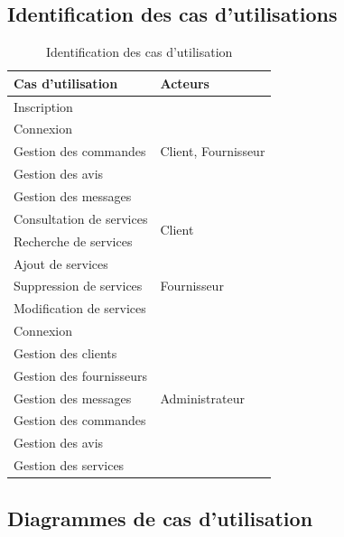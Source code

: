 \documentclass[french]{report}
\begin{document}
\subsection{Identification des cas d'utilisations}
\begin{table}[H]
    \centering
    \begin{tabular}{|m{5cm}|m{5cm}|}
        \hline
        \textbf{Cas d'utilisation} & \textbf{Acteurs} \\
        \hline
        Inscription & \multirow{5}{5cm}{Client, Fournisseur} \\
        Connexion & \\
        Gestion des commandes & \\
        Gestion des avis & \\
        Gestion des messages & \\
        \hline
        Consultation de services & \multirow{2}{5cm}{Client} \\
        Recherche de services & \\
        \hline
        Ajout de services & \multirow{3}{5cm}{Fournisseur} \\
        Suppression de services & \\
        Modification de services & \\
        \hline
        Connexion & \multirow{7}{5cm}{Administrateur} \\
        Gestion des clients & \\
        Gestion des fournisseurs & \\
        Gestion des messages & \\
        Gestion des commandes & \\
        Gestion des avis & \\
        Gestion des services & \\
        \hline
    \end{tabular}
    \caption{Identification des cas d'utilisation}
    \label{tab:my_label}
\end{table}

\subsection{Diagrammes de cas d'utilisation}
\end{document}
